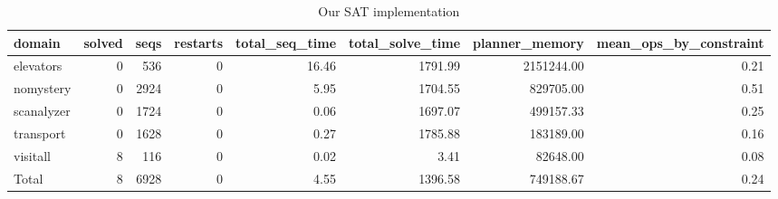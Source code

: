 \begin{table*}[htbp]
\centering
\begingroup\small
\begin{tabular}{lrrrrrrr}
  \hline
domain & solved & seqs & restarts & total\_seq\_time & total\_solve\_time & planner\_memory & mean\_ops\_by\_constraint \\ 
  \hline
elevators &   0 & 536 &   0 & 16.46 & 1791.99 & 2151244.00 & 0.21 \\ 
  nomystery &   0 & 2924 &   0 & 5.95 & 1704.55 & 829705.00 & 0.51 \\ 
  scanalyzer &   0 & 1724 &   0 & 0.06 & 1697.07 & 499157.33 & 0.25 \\ 
  transport &   0 & 1628 &   0 & 0.27 & 1785.88 & 183189.00 & 0.16 \\ 
  visitall &   8 & 116 &   0 & 0.02 & 3.41 & 82648.00 & 0.08 \\ 
  Total &   8 & 6928 &   0 & 4.55 & 1396.58 & 749188.67 & 0.24 \\ 
   \hline
\end{tabular}
\endgroup
\caption{Our SAT implementation} 
\label{tab:selected_sat}
\end{table*}
